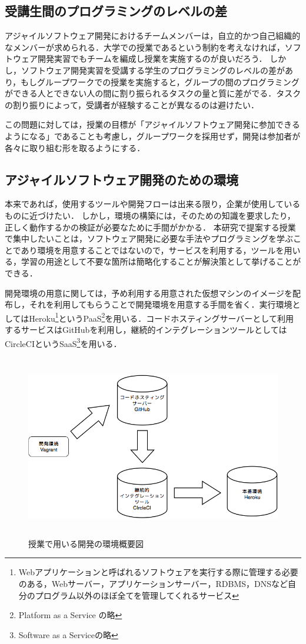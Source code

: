 \subsection{受講生間のプログラミングのレベルの差}

アジャイルソフトウェア開発におけるチームメンバーは，自立的かつ自己組織的なメンバーが求められる．大学での授業であるという制約を考えなければ，ソフトウェア開発実習でもチームを編成し授業を実施するのが良いだろう．
しかし，ソフトウェア開発実習を受講する学生のプログラミングのレベルの差があり，もしグループワークでの授業を実施すると，グループの間のプログラミングができる人とできない人の間に割り振られるタスクの量と質に差がでる．タスクの割り振りによって，受講者が経験することが異なるのは避けたい．

この問題に対しては，授業の目標が「アジャイルソフトウェア開発に参加できるようになる」であることも考慮し，グループワークを採用せず，開発は参加者が各々に取り組む形を取るようにする．

\subsection{アジャイルソフトウェア開発のための環境}

本来であれば，使用するツールや開発フローは出来る限り，企業が使用しているものに近づけたい．
しかし，環境の構築には，そのための知識を要求したり，正しく動作するかの検証が必要なために手間がかかる．
本研究で提案する授業で集中したいことは，ソフトウェア開発に必要な手法やプログラミングを学ぶことであり環境を用意することではないので，サービスを利用する，ツールを用いる，学習の用途として不要な箇所は簡略化することが解決策として挙げることができる．

開発環境の用意に関しては，予め利用する用意された仮想マシンのイメージを配布し，それを利用してもらうことで開発環境を用意する手間を省く．実行環境としてはHeroku\footnote{Webアプリケーションと呼ばれるソフトウェアを実行する際に管理する必要のある，Webサーバー，アプリケーションサーバー，RDBMS，DNSなど自分のプログラム以外のほぼ全てを管理してくれるサービス}というPaaS\footnote{Platform as a Service の略}を用いる．コードホスティングサーバーとして利用するサービスはGitHubを利用し，継続的インテグレーションツールとしてはCircleCIというSaaS\footnote{Software as a Serviceの略}を用いる．


\begin{figure}[H]
\centering
\includegraphics[height=8cm]{./assets/images/class_dev_env.png}
\caption{授業で用いる開発の環境概要図}
\label{fig:class_dev_env}
\end{figure}
